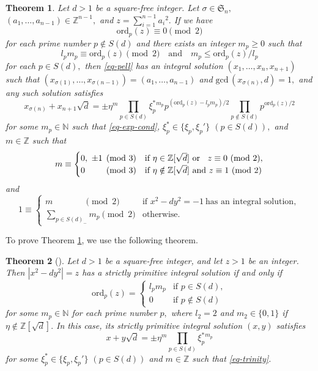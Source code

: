\documentclass{article}
\theoremstyle{definition}
\theoremstyle{plain}
\newtheorem{thm}{Theorem}
\begin{document}
\begin{thm}\label{thm-form-plike}
Let $d > 1$ be a square-free integer. 
Let $\sigma \in \mathfrak S_n,$ $(a_1,\dots,a_{n-1}) \in \mathbb Z^{n-1},$ and $z = \sum_{i = 1}^{n-1}a_i{}^2.$ 
If we have 
\[\mathrm{ord}_p(z) \equiv 0 \pmod 2\] 
for each prime number $p \notin S(d)$ and there exists an integer $m_p \geq 0$ such that 
\begin{equation} 
l_pm_p \equiv \mathrm{ord}_p(z) \pmod 2 \quad\text{and}\quad m_p \leq \mathrm{ord}_p(z)/l_p \label{eq-exp-cond} 
\end{equation} 
for each $p \in S(d),$ then \eqref{eq-pell} has an integral solution $(x_1,\dots,x_n,x_{n+1})$ such that $(x_{\sigma (1)},\dots,x_{\sigma (n-1)}) = (a_1,\dots,a_{n-1})$ and $\mathrm{gcd}\,(x_{\sigma (n)},d) = 1,$ and any such solution satisfies 
\begin{equation} 
x_{\sigma (n)}+x_{n+1}\sqrt d = \pm\eta ^m\prod_{p \in S(d)}\xi _p^*{}^{m_p}p^{(\mathrm{ord}_p(z)-l_pm_p)/2}\prod_{p \notin S(d)}p^{\mathrm{ord}_p(z)/2} \label{eq-form-plike} 
\end{equation} 
for some $m_p \in \mathbb N$ such that \eqref{eq-exp-cond}, $\xi _p^* \in \{\xi _p,\xi _p{}'\}$ $(p \in S(d)),$ and $m \in \mathbb Z$ such that 
\begin{equation} 
m \equiv \begin{cases} 
0,\ \pm 1 \pmod 3 & \text{if }\eta \in \mathbb Z[\sqrt d]\text{ or \ \:}z \equiv 0\ (\mathrm{mod}\ 2), \\ 
0\qquad\:\!\pmod 3 & \text{if }\eta \notin \mathbb Z[\sqrt d]\text{ and }z \equiv 1\ (\mathrm{mod}\ 2) 
\end{cases} \label{eq-trinity} 
\end{equation} 
and 
\begin{equation} 
1 \equiv \begin{cases} 
m\qquad\quad\:\:\:\pmod 2 & \text{if }x^2-dy^2 = -1\ \text{has an integral solution}, \\ 
\displaystyle\sum_ {p \in S(d)_-}m_p \pmod 2 & \text{otherwise}. 
\end{cases} \label{eq-cond-idx} 
\end{equation} 
\end{thm}
To prove Theorem \ref{thm-form-plike}, we use the following theorem.
\begin{thm}[{\cite[Theorem 2(a)]{Hir24}}]\label{thm-form-pell}
Let $d > 1$ be a square-free integer, and let $z > 1$ be an integer. 
Then $|x^2-dy^2| = z$ has a strictly primitive integral solution if and only if 
\[\mathrm{ord}_p(z) = \left\{\begin{array}{lll} 
l_pm_p & \text{if }p \in S(d), \\ 
0 & \text{if }p \notin S(d) 
\end{array}\right.\] 
for some $m_p \in \mathbb N$ for each prime number $p,$ where $l_2 = 2$ and $m_2 \in \{ 0,1\}$ if $\eta \notin \mathbb Z[\sqrt d].$ 
In this case, its strictly primitive integral solution $(x,y)$ satisfies 
\[ x+y\sqrt d = \pm\eta ^m\prod_{p \in S(d)}\xi _p^*{}^{m_p}\] 
for some $\xi _p^* \in \{\xi _p,\xi _p'\}$ $(p \in S(d))$ and $m \in \mathbb Z$ such that \eqref{eq-trinity}. 
\end{thm}
\end{document}

